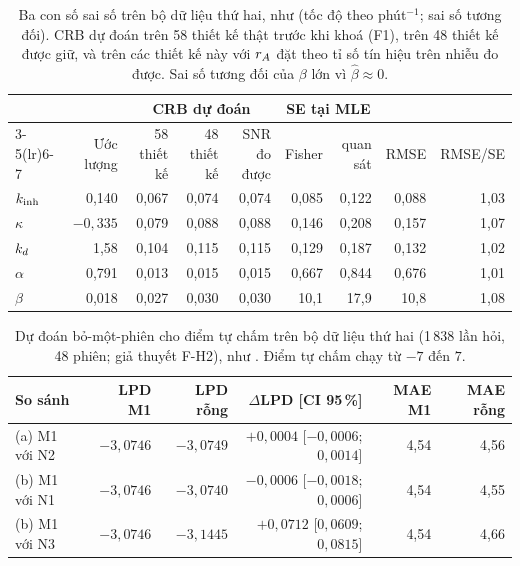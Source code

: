 \begin{table}[H]
\centering\footnotesize
\caption{Ba con số sai số trên bộ dữ liệu thứ hai, như  (tốc độ theo phút$^{-1}$; sai số tương đối). CRB dự đoán trên 58 thiết kế thật trước khi khoá (F1), trên 48 thiết kế được giữ, và trên các thiết kế này với $r_{A}$ đặt theo tỉ số tín hiệu trên nhiễu đo được. Sai số tương đối của $\beta$ lớn vì $\hat\beta\approx0$.}
\label{tab:osf-errors}
\setlength{\tabcolsep}{3pt}
\begin{tabular}{lrrrrrrrr}
\toprule
 & & \multicolumn{3}{c}{CRB dự đoán} & \multicolumn{2}{c}{SE tại MLE} & & \\
\cmidrule(lr){3-5}\cmidrule(lr){6-7}
 & Ước lượng & 58 thiết kế & 48 thiết kế & SNR đo được & Fisher & quan sát & RMSE & RMSE/SE \\
\midrule
$k_{\mathrm{inh}}$  & 0,140      & 0,067 & 0,074 & 0,074 & 0,085 & 0,122 & 0,088 & 1,03 \\
$\kappa$ & $-0{,}335$ & 0,079 & 0,088 & 0,088 & 0,146 & 0,208 & 0,157 & 1,07 \\
$k_{d}$    & 1,58       & 0,104 & 0,115 & 0,115 & 0,129 & 0,187 & 0,132 & 1,02 \\
$\alpha$ & 0,791      & 0,013 & 0,015 & 0,015 & 0,667 & 0,844 & 0,676 & 1,01 \\
$\beta$  & 0,018      & 0,027 & 0,030 & 0,030 & 10,1  & 17,9  & 10,8  & 1,08 \\
\bottomrule
\end{tabular}
\end{table}

\begin{table}[H]
\centering\footnotesize
\caption{Dự đoán bỏ-một-phiên cho điểm tự chấm trên bộ dữ liệu thứ hai (1\,838 lần hỏi, 48 phiên; giả thuyết F-H2), như . Điểm tự chấm chạy từ $-7$ đến $7$.}
\label{tab:osf-loso}
\setlength{\tabcolsep}{4pt}
\begin{tabular}{lrrrrr}
\toprule
So sánh & LPD M1 & LPD rỗng & $\Delta$LPD [CI 95\,\%] & MAE M1 & MAE rỗng \\
\midrule
(a) M1 với N2 & $-3{,}0746$ & $-3{,}0749$ & $+0{,}0004$ [$-0{,}0006$; $0{,}0014$] & 4,54 & 4,56 \\
(b) M1 với N1 & $-3{,}0746$ & $-3{,}0740$ & $-0{,}0006$ [$-0{,}0018$; $0{,}0006$] & 4,54 & 4,55 \\
(b) M1 với N3 & $-3{,}0746$ & $-3{,}1445$ & $+0{,}0712$ [$0{,}0609$; $0{,}0815$] & 4,54 & 4,66 \\
\bottomrule
\end{tabular}
\end{table}

